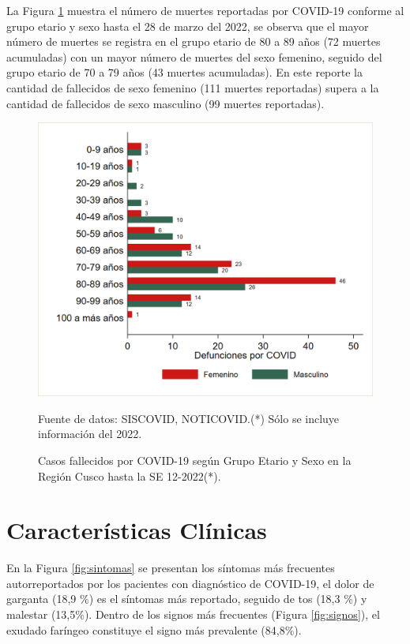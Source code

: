 \documentclass[12pt,a4paper,openany]{book}
\begin{document}
La Figura \ref{fig:fallecidos_edad_sexo}  muestra el número de muertes reportadas por COVID-19 conforme al grupo etario y sexo hasta el 28 de marzo del 2022, se observa que el mayor número de muertes se registra en el grupo etario de 80 a 89 años (72 muertes acumuladas) con un mayor número de muertes del sexo femenino, seguido del grupo etario de 70 a 79 años (43 muertes acumuladas). En este reporte la cantidad de fallecidos de sexo femenino (111 muertes reportadas) supera a la cantidad de fallecidos de sexo masculino (99 muertes reportadas). 

\begin{figure}[h]
	\caption{Casos fallecidos por COVID-19 según Grupo Etario y Sexo en la Región Cusco hasta la SE 12-2022(*).}\label{fig:fallecidos_edad_sexo}
	\begin{center}
		\includegraphics[width=0.75\linewidth]{../figuras/defunciones_etapavida_2022}
	\end{center}
	{\footnotesize {Fuente de datos: SISCOVID, NOTICOVID.(*) Sólo se incluye información del 2022.}}
\end{figure}



\cleardoublepage


\clearpage

\section*{Características Clínicas}
\noindent En la Figura \ref{fig:sintomas} se presentan los síntomas más frecuentes autorreportados por los pacientes con diagnóstico de COVID-19, el dolor de garganta (18,9 $\%$) es el síntomas más reportado, seguido de tos (18,3 $\%$) y malestar (13,5$\%$). Dentro de los signos más frecuentes (Figura \ref{fig:signos}), el exudado faríngeo constituye el signo más prevalente (84,8$\%$). 
\end{document}
